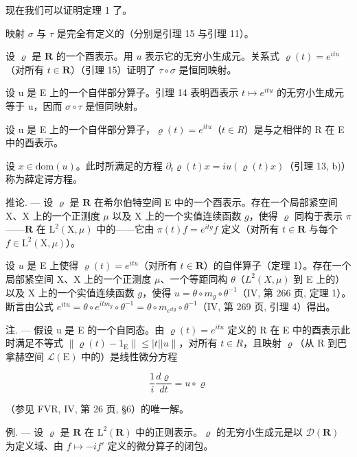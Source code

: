现在我们可以证明定理 1 了。

映射 \(\sigma\) 与 \(\tau\) 是完全有定义的（分别是引理 15 与引理 11）。

设 \(\varrho\) 是 \(\mathbf{R}\) 的一个酉表示。用 \(u\) 表示它的无穷小生成元。关系式 \(\varrho(t) = e^{itu}\)（对所有 \(t \in \mathbf{R}\)）（引理 15）证明了 \(\tau \circ \sigma\) 是恒同映射。

设 u 是 E 上的一个自伴部分算子。引理 14 表明酉表示 \(t \mapsto e^{itu}\) 的无穷小生成元等于 u，因而 \(\sigma \circ \tau\) 是恒同映射。

设 u 是 E 上的一个自伴部分算子，\(\varrho(t) = e^{itu}\)（\(t \in R\)）是与之相伴的 R 在 E 中的酉表示。

设 \(x \in \text{dom}(u)\)。此时所满足的方程 \(\partial_{t} \varrho(t)x = i u(\varrho(t)x)\)（引理 13, b)）称为薛定谔方程。

推论. --- 设 \(\varrho\) 是 \(\mathbf{R}\) 在希尔伯特空间 E 中的一个酉表示。存在一个局部紧空间 X、X 上的一个正测度 \(\mu\) 以及 X 上的一个实值连续函数 \(g\)，使得 \(\varrho\) 同构于表示 \(\pi\)——\(\mathbf{R}\) 在 \(\mathrm{L}^2 (\mathrm{X},\mu)\) 中的——它由 \(\pi (t)f = e^{itg}f\) 定义（对所有 \(t\in \mathbf{R}\) 与每个 \(f\in \mathrm{L}^2 (\mathrm{X},\mu)\)）。

设 \(u\) 是 E 上使得 \(\varrho(t) = e^{itu}\)（对所有 \(t \in \mathbf{R}\)）的自伴算子（定理 1）。存在一个局部紧空间 X、X 上的一个正测度 \(\mu\)、一个等距同构 \(\theta\)（\(L^2(X, \mu)\) 到 E 上的） 以及 X 上的一个实值连续函数 \(g\)，使得 \(u = \theta \circ m_g \circ \theta^{-1}\)（IV, 第 266 页, 定理 1）。断言由公式 \(e^{itu} = \theta \circ e^{itm_g} \circ \theta^{-1} = \theta \circ m_{e^{itg}} \circ \theta^{-1}\)（IV, 第 269 页, 引理 4）得出。

注. --- 假设 u 是 E 的一个自同态。由 \(\varrho(t) = e^{itu}\) 定义的 R 在 E 中的酉表示此时满足不等式 \(\|\varrho(t) - 1_{\mathrm{E}}\| \leqslant |t||u\|\)，对所有 \(t \in R\)，且映射 \(\varrho\)（从 R 到巴拿赫空间 \(\mathcal{L}(\mathrm{E})\) 中的）是线性微分方程

\[
\frac {1}{i} \frac {d \varrho}{d t} = u \circ \varrho
\]

（参见 FVR, IV, 第 26 页, §6）的唯一解。

例. --- 设 \(\varrho\) 是 \(\mathbf{R}\) 在 \(\mathrm{L}^2 (\mathbf{R})\) 中的正则表示。\(\varrho\) 的无穷小生成元是以 \(\mathcal{D}(\mathbf{R})\) 为定义域、由 \(f\mapsto -if'\) 定义的微分算子的闭包。

